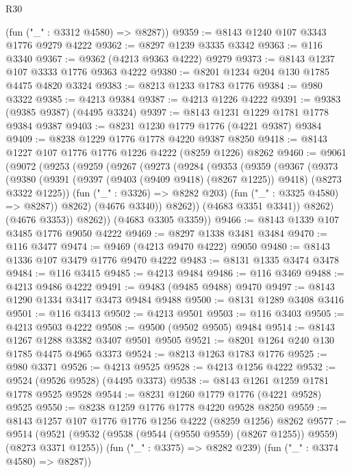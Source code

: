 \begin{lexlean}{R30}
\begin{coremodule}
{{{{{      (fun ("_" : @3312 @4580) => @8287))
@9359 := @8143 @1240 @107 @3343 @1776 @9279 @4222
@9362 := @8297 @1239 @3335 @3342
@9363 := @116 @3340
@9367 := @9362 (@4213 @9363 @4222) @9279
@9373 := @8143 @1237 @107 @3333 @1776 @9363 @4222
@9380 := @8201 @1234 @204 @130 @1785 @4475 @4820 @3324
@9383 := @8213 @1233 @1783 @1776
@9384 := @980 @3322
@9385 := @4213 @9384
@9387 := @4213 @1226 @4222
@9391 := @9383 (@9385 @9387) (@4495 @3324)
@9397 := @8143 @1231 @1229 @1781 @1778 @9384 @9387
@9403 := @8231 @1230 @1779 @1776 (@4221 @9387) @9384
@9409 := @8238 @1229 @1776 @1778 @4220 @9387 @8250
@9418 := @8143 @1227 @107 @1776 @1776 @1226 @4222 (@8259 @1226) @8262
@9460 := @9061
    (@9072
      (@9253
        (@9259
          (@9267
            (@9273
              (@9284
                (@9353
                  (@9359
                    (@9367
                      (@9373
                        (@9380
                          (@9391
                            (@9397 (@9403 (@9409 @9418) (@8267 @1225)) @9418)
                            (@8273 @3322 @1225))
                          (fun ("_" : @3326) => @8282 @203)
                          (fun ("_" : @3325 @4580) => @8287))
                        @8262)
                      (@4676 @3340))
                    @8262))
                (@4683 @3351 @3341))
              @8262)
            (@4676 @3353))
          @8262))
      (@4683 @3305 @3359))
@9466 := @8143 @1339 @107 @3485 @1776 @9050 @4222
@9469 := @8297 @1338 @3481 @3484
@9470 := @116 @3477
@9474 := @9469 (@4213 @9470 @4222) @9050
@9480 := @8143 @1336 @107 @3479 @1776 @9470 @4222
@9483 := @8131 @1335 @3474 @3478
@9484 := @116 @3415
@9485 := @4213 @9484
@9486 := @116 @3469
@9488 := @4213 @9486 @4222
@9491 := @9483 (@9485 @9488) @9470
@9497 := @8143 @1290 @1334 @3417 @3473 @9484 @9488
@9500 := @8131 @1289 @3408 @3416
@9501 := @116 @3413
@9502 := @4213 @9501
@9503 := @116 @3403
@9505 := @4213 @9503 @4222
@9508 := @9500 (@9502 @9505) @9484
@9514 := @8143 @1267 @1288 @3382 @3407 @9501 @9505
@9521 := @8201 @1264 @240 @130 @1785 @4475 @4965 @3373
@9524 := @8213 @1263 @1783 @1776
@9525 := @980 @3371
@9526 := @4213 @9525
@9528 := @4213 @1256 @4222
@9532 := @9524 (@9526 @9528) (@4495 @3373)
@9538 := @8143 @1261 @1259 @1781 @1778 @9525 @9528
@9544 := @8231 @1260 @1779 @1776 (@4221 @9528) @9525
@9550 := @8238 @1259 @1776 @1778 @4220 @9528 @8250
@9559 := @8143 @1257 @107 @1776 @1776 @1256 @4222 (@8259 @1256) @8262
@9577 := @9514
    (@9521
      (@9532 (@9538 (@9544 (@9550 @9559) (@8267 @1255)) @9559) (@8273 @3371 @1255))
      (fun ("_" : @3375) => @8282 @239)
      (fun ("_" : @3374 @4580) => @8287))
}}}}}
\end{coremodule}
\end{lexlean}
